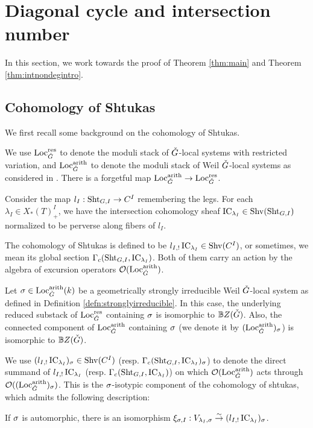 \documentclass[reqno]{amsart}
\numberwithin{equation}{section}
\numberwithin{equation}{section}
\begin{document}
\section{Diagonal cycle and intersection number}\label{sec:diagcycle}
In this section, we work towards the proof of Theorem \ref{thm:main} and Theorem \ref{thm:intnondegintro}.
\subsection{Cohomology of Shtukas}\label{sec:cohshtuka}
We first recall some background on the cohomology of Shtukas.

We use $\mathrm{Loc}_{\check{G}}^{\mathrm{res}}$ to denote the moduli stack of $\check{G}$-local systems with restricted variation, and $\mathrm{Loc}_{\check{G}}^{\mathrm{arith}}$ to denote the moduli stack of Weil $\check{G}$-local systems as considered in \cite{arinkin2022stacklocalsystemsrestricted}. There is a forgetful map $\mathrm{Loc}_{\check{G}}^{\mathrm{arith}}\to \mathrm{Loc}_{\check{G}}^{\mathrm{res}}$.

Consider the map $l_I:\operatorname{Sht}_{G,I}\to C^I$ remembering the legs. For each $\lambda_I\in X_*(T)_+^I$, we have the intersection cohomology sheaf $\operatorname{IC}_{\lambda_I}\in \mathrm{Shv}(\operatorname{Sht}_{G,I})$ normalized to be perverse along fibers of $l_I$. 

The cohomology of Shtukas is defined to be $l_{I,!} \operatorname{IC}_{\lambda_I}\in \mathrm{Shv}(C^I)$, or sometimes, we mean its global section $\Gamma_c(\operatorname{Sht}_{G,I}, \operatorname{IC}_{\lambda_I})$. Both of them carry an action by the algebra of excursion operators $\mathcal{O}(\mathrm{Loc}_{\check{G}}^{\mathrm{arith}})$.

Let $\sigma\in \mathrm{Loc}_{\check{G}}^{\mathrm{arith}}(k)$ be a geometrically strongly irreducible Weil $\check{G}$-local system as defined in Definition \ref{defn:stronglyirreducible}. In this case, the underlying reduced substack of $\mathrm{Loc}_{\check{G}}^{\mathrm{res}}$ containing $\sigma$ is isomorphic to $\mathbb{B}Z(\check{G})$. Also, the connected component of $\mathrm{Loc}_{\check{G}}^{\mathrm{arith}}$ containing $\sigma$ (we denote it by $(\mathrm{Loc}_{\check{G}}^{\mathrm{arith}})_{\sigma}$) is isomorphic to $\mathbb{B}Z(\check{G})$.

We use $(l_{I,!}\operatorname{IC}_{\lambda_I})_{\sigma}\in \mathrm{Shv}(C^I)$ (resp. $\Gamma_c(\operatorname{Sht}_{G,I}, \operatorname{IC}_{\lambda_I})_{\sigma}$) to denote the direct summand of $l_{I,!}\operatorname{IC}_{\lambda_I}$ (resp. $\Gamma_c(\operatorname{Sht}_{G,I}, \operatorname{IC}_{\lambda_I})$) on which $\mathcal{O}(\mathrm{Loc}_{\check{G}}^{\mathrm{arith}})$ acts through $\mathcal{O}((\mathrm{Loc}_{\check{G}}^{\mathrm{arith}})_{\sigma})$. This is the $\sigma$-isotypic component of the cohomology of shtukas, which admits the following description:

\begin{prop}\label{prop:cohshtuka}
If $\sigma$ is automorphic, there is an isomorphism $\xi_{\sigma,I}: V_{\lambda_I,\sigma}\stackrel{\sim}{\to} (l_{I,!}\operatorname{IC}_{\lambda_I})_{\sigma}$.
\end{prop}
\end{document}
